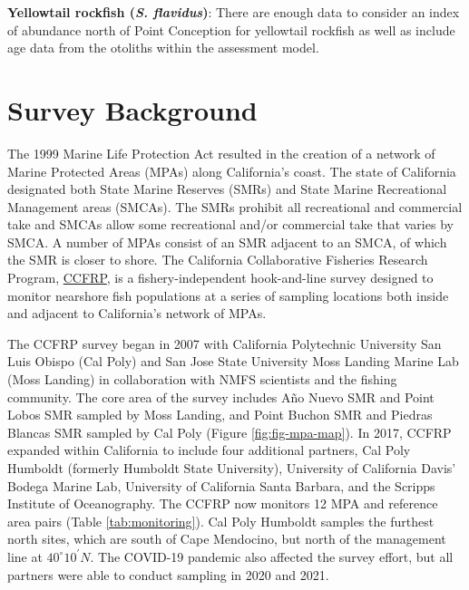\documentclass[
]{article}
\begin{document}
\textbf{Yellowtail rockfish (\emph{S. flavidus})}: There are enough data to consider an index of abundance north of
Point Conception for yellowtail rockfish as well as include age data from the otoliths
within the assessment model.

\hypertarget{survey-background}{%
\section{Survey Background}\label{survey-background}}

The 1999 Marine Life Protection Act resulted in the creation of a network of
Marine Protected Areas (MPAs) along California's coast. The state of California
designated both State Marine Reserves (SMRs) and State Marine Recreational
Management areas (SMCAs). The SMRs prohibit all recreational and commercial take
and SMCAs allow some recreational and/or commercial take that varies by SMCA.
A number of MPAs consist of an SMR adjacent to an SMCA, of which the SMR is closer to shore.
The California Collaborative Fisheries Research Program,
\href{https://www.mlml.calstate.edu/ccfrp/}{CCFRP},
is a fishery-independent hook-and-line survey designed to monitor nearshore fish
populations at a series of sampling locations both inside and adjacent to
California's network of MPAs.

The CCFRP survey began in 2007 with California Polytechnic University
San Luis Obispo (Cal Poly) and San Jose State University Moss Landing Marine Lab
(Moss Landing) in collaboration with NMFS scientists and the fishing community. The core
area of the survey includes Año Nuevo SMR and Point Lobos SMR sampled by
Moss Landing, and Point Buchon SMR and Piedras Blancas SMR sampled by Cal Poly (Figure \ref{fig:fig-mpa-map}). In 2017, CCFRP expanded within
California to include four additional partners, Cal Poly Humboldt (formerly Humboldt State
University), University of California Davis' Bodega Marine Lab, University
of California Santa Barbara, and the Scripps Institute of Oceanography.
The CCFRP now monitors 12 MPA and reference area pairs (Table \ref{tab:monitoring}).
Cal Poly Humboldt samples the furthest north sites, which are south of Cape
Mendocino, but north of the management line at $40^\circ 10^\prime N$. The COVID-19 pandemic also affected the
survey effort, but all partners were able to conduct sampling in 2020 and 2021.
\end{document}
